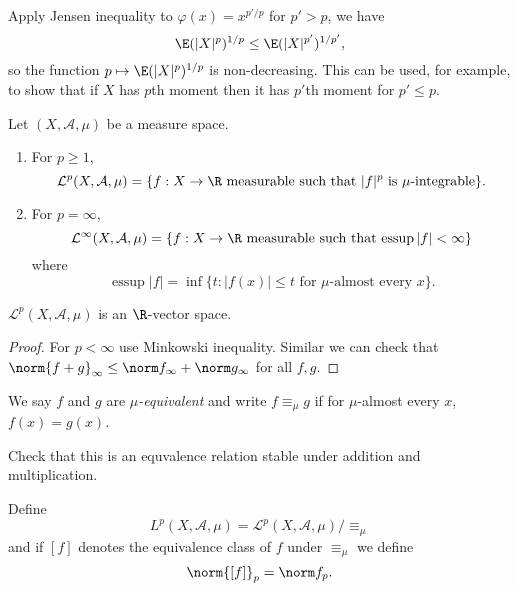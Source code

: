 \documentclass[a4paper]{article}
\DeclareMathOperator{\essup}{essup} %
\begin{document}
\begin{remark}
  Apply Jensen inequality to \(\varphi(x) = x^{p'/p}\) for \(p' > p\), we have
  \[
    \E(|X|^p)^{1/p} \leq \E(|X|^{p'})^{1/p'},
  \]
  so the function \(p \mapsto \E(|X|^p)^{1/p}\) is non-decreasing. This can be used, for example, to show that if \(X\) has \(p\)th moment then it has \(p'\)th moment for \(p' \leq p\).
\end{remark}

\begin{definition}
  Let \((X, \mathcal A, \mu)\) be a measure space.
  \begin{enumerate}
  \item For \(p \geq 1\),
    \[
      \mathcal L^p(X, \mathcal A, \mu) = \{f: X \to \R \text{ measurable such that \(|f|^p\) is \(\mu\)-integrable}\}.
    \]
  \item For \(p = \infty\),
    \[
      \mathcal L^\infty(X, \mathcal A, \mu) = \{f: X \to \R \text{ measurable such that \(\essup |f| < \infty\)}\}
    \]
    where
    \[
      \essup |f| = \inf \{t: |f(x)| \leq t \text{ for \(\mu\)-almost every } x\}.
    \]
  \end{enumerate}
\end{definition}

\begin{lemma}
  \(\mathcal L^p(X, \mathcal A, \mu)\) is an \(\R\)-vector space.
\end{lemma}

\begin{proof}
  For \(p < \infty\) use Minkowski inequality. Similar we can check that \(\norm{f + g}_\infty \leq \norm f_\infty + \norm g_\infty\) for all \(f, g\).
\end{proof}

\begin{definition}
  We say \(f\) and \(g\) are \emph{\(\mu\)-equivalent} and write \(f \equiv_\mu g\) if for \(\mu\)-almost every \(x\), \(f(x) = g(x)\).
\end{definition}

Check that this is an equvalence relation stable under addition and multiplication.

\begin{definition}[\(L^p\)-space]
  Define
  \[
    L^p(X, \mathcal A, \mu) = \mathcal L^p(X, \mathcal A, \mu) / \equiv_\mu
  \]
  and if \([f]\) denotes the equivalence class of \(f\) under \(\equiv_\mu\) we define
  \[
    \norm{[f]}_p = \norm f_p.
  \]
\end{definition}
\end{document}
